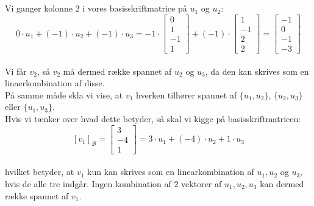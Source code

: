 \documentclass[a4paper,12pt]{article}
\begin{document}
\subsection{}

Vi ganger kolonne 2 i vores basisskriftmatrice på $u_1$ og $u_2$:
\[
0\cdot u_1 + (-1) \cdot u_2 + (-1)\cdot u_3 =
-1 \cdot
\left[\begin{array}{ccc}
    0\\
    1\\
    -1\\
    1
\end{array}\right]
+
(-1) \cdot
\left[\begin{array}{ccc}
    1\\
    -1\\
    2\\
    2
\end{array}\right]
=
\left[\begin{array}{ccc}
    -1\\
    0\\
    -1\\
    -3
\end{array}\right]
\]\\

Vi får $v_2$, så $v_2$ må dermed række spannet af $u_2$ og $u_3$, da den kan skrives som en linaerkombination af disse.\\

På samme måde skla vi vise, at $v_1$ hverken tilhører spannet af $\{u_1, u_2\}$, $\{u_2, u_3\}$ eller $\{u_1, u_3\}.$\\
Hvis vi tænker over hvad dette betyder, så skal vi kigge på basisskriftmatricen:\\

\[
[v_1]_{\mathcal{B}} =
\left[\begin{array}{ccc}
    3 \\
    -4\\
    1 
\end{array}\right]
=
3 \cdot u_1 + (-4) \cdot u_2 + 1 \cdot u_3
\]\\

hvilket betyder, at $v_1$ kun kan skrives som en linearkombination af $u_1, u_2$ og $u_3$, hvis de alle tre indgår. Ingen kombination af 2 vektorer af $u_1, u_2, u_3$ kan dermed række spannet af $v_1$.
\end{document}

